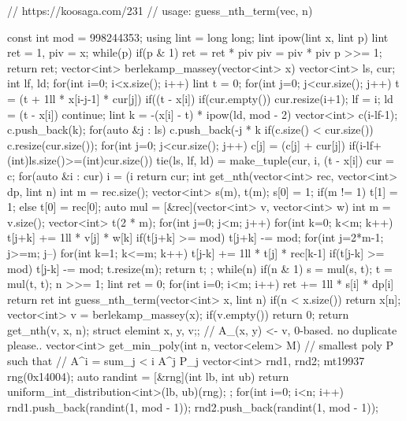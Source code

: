 \begin{cpp}
// https://koosaga.com/231
// usage: guess_nth_term(vec, n)

const int mod = 998244353;
using lint = long long;
lint ipow(lint x, lint p){
  lint ret = 1, piv = x;
  while(p){
    if(p & 1) ret = ret * piv %
    piv = piv * piv %
    p >>= 1;
  }
  return ret;
}
vector<int> berlekamp_massey(vector<int> x){
  vector<int> ls, cur;
  int lf, ld;
  for(int i=0; i<x.size(); i++){
    lint t = 0;
    for(int j=0; j<cur.size(); j++){
      t = (t + 1ll * x[i-j-1] * cur[j]) %
    }
    if((t - x[i]) %
    if(cur.empty()){
      cur.resize(i+1);
      lf = i;
      ld = (t - x[i]) %
      continue;
    }
    lint k = -(x[i] - t) * ipow(ld, mod - 2) %
    vector<int> c(i-lf-1);
    c.push_back(k);
    for(auto &j : ls) c.push_back(-j * k %
    if(c.size() < cur.size()) c.resize(cur.size());
    for(int j=0; j<cur.size(); j++){
      c[j] = (c[j] + cur[j]) %
    }
    if(i-lf+(int)ls.size()>=(int)cur.size()){
      tie(ls, lf, ld) = make_tuple(cur, i, (t - x[i]) %
    }
    cur = c;
  }
  for(auto &i : cur) i = (i %
  return cur;
}
int get_nth(vector<int> rec, vector<int> dp, lint n){
  int m = rec.size();
  vector<int> s(m), t(m);
  s[0] = 1;
  if(m != 1) t[1] = 1;
  else t[0] = rec[0];
  auto mul = [&rec](vector<int> v, vector<int> w){
    int m = v.size();
    vector<int> t(2 * m);
    for(int j=0; j<m; j++){
      for(int k=0; k<m; k++){
        t[j+k] += 1ll * v[j] * w[k] %
        if(t[j+k] >= mod) t[j+k] -= mod;
      }
    }
    for(int j=2*m-1; j>=m; j--){
      for(int k=1; k<=m; k++){
        t[j-k] += 1ll * t[j] * rec[k-1] %
        if(t[j-k] >= mod) t[j-k] -= mod;
      }
    }
    t.resize(m);
    return t;
  };
  while(n){
    if(n & 1) s = mul(s, t);
    t = mul(t, t);
    n >>= 1;
  }
  lint ret = 0;
  for(int i=0; i<m; i++) ret += 1ll * s[i] * dp[i] %
  return ret %
}
int guess_nth_term(vector<int> x, lint n){
  if(n < x.size()) return x[n];
  vector<int> v = berlekamp_massey(x);
  if(v.empty()) return 0;
  return get_nth(v, x, n);
}
struct elem{int x, y, v;};
  // A_(x, y) <- v, 0-based. no duplicate please..
vector<int> get_min_poly(int n, vector<elem> M){
  // smallest poly P such that
  // A^i = sum_{j < i} {A^j \times P_j}
  vector<int> rnd1, rnd2;
  mt19937 rng(0x14004);
  auto randint = [&rng](int lb, int ub){
    return uniform_int_distribution<int>(lb, ub)(rng);
  };
  for(int i=0; i<n; i++){
    rnd1.push_back(randint(1, mod - 1));
    rnd2.push_back(randint(1, mod - 1));
}}
\end{cpp}
